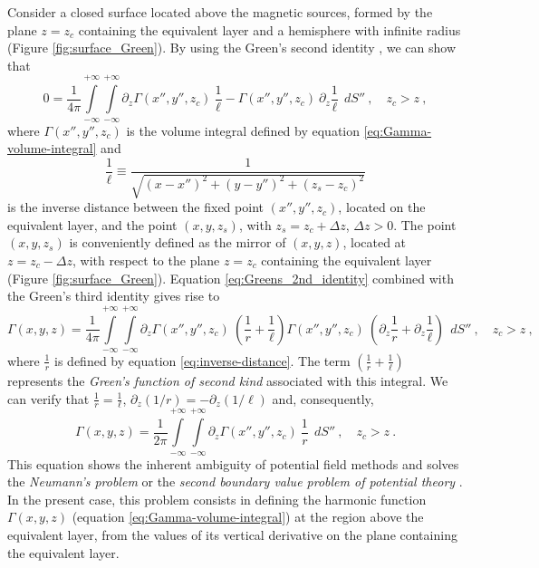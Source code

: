 \label{append:proof-positive-p}

Consider a closed surface located above the magnetic sources, formed by the plane $z = z_{c}$ containing the equivalent layer and a hemisphere with infinite radius
(Figure \ref{fig:surface_Green}).
By using the Green's second identity \citep[][ p. 215]{kellogg1967}, we can show that
\begin{equation}
0 = \frac{1}{4\pi}
\int\limits_{-\infty}^{+\infty}\int\limits_{-\infty}^{+\infty}
\partial_{z} \Gamma(x'', y'', z_{c}) \: \frac{1}{\ell} - 
\Gamma(x'', y'', z_{c}) \: \partial_{z} \frac{1}{\ell}
\:\: dS'' \: , \quad z_{c} > z \: ,
\label{eq:Greens_2nd_identity}
\end{equation}
where $\Gamma(x'', y'', z_{c})$ is the volume integral defined by equation 
\ref{eq:Gamma-volume-integral} and
\begin{equation}
\frac{1}{\ell} \equiv \frac{1}{\sqrt{(x - x'')^{2} +
		(y - y'')^{2} +
		(z_{s} - z_{c})^{2}}}
\label{eq:inv-l}
\end{equation}
is the inverse distance between the fixed point $(x'', y'', z_{c})$, located on the
equivalent layer, and the point $(x, y, z_{s})$, with $z_{s} = z_{c} + \Delta z$,
$\Delta z > 0$.
The point $(x, y, z_{s})$ is conveniently defined as the mirror of $(x, y, z)$,
located at $z = z_{c} - \Delta z$, with respect to the plane $z = z_{c}$ containing
the equivalent layer (Figure \ref{fig:surface_Green}).
Equation \ref{eq:Greens_2nd_identity} combined with the 
Green's third identity \citep[][ p. 219]{kellogg1967} gives rise to
\begin{equation}
\Gamma(x, y, z) = \frac{1}{4\pi}
\int\limits_{-\infty}^{+\infty}\int\limits_{-\infty}^{+\infty}
\partial_{z} \Gamma(x'', y'', z_{c}) \: 
\left( \frac{1}{r} + \frac{1}{\ell} \right)
\Gamma(x'', y'', z_{c}) \: 
\left( \partial_{z} \frac{1}{r} + \partial_{z} \frac{1}{\ell} \right)
\:\: dS'' \: , \quad z_{c} > z \: ,
\label{eq:Greens_3rd_identity}
\end{equation}
where $\frac{1}{r}$ is defined by equation \ref{eq:inverse-distance}.
The term $\left( \frac{1}{r} + \frac{1}{\ell} \right)$ represents the 
\textit{Green's function of second kind} \citep[][ p. 246]{kellogg1967} 
associated with this integral.
We can verify that $\frac{1}{r} = \frac{1}{\ell}$, $\partial_{z} (1/r) = -\partial_{z} (1/\ell)$
and, consequently, 
\begin{equation}
\Gamma(x, y, z) = \frac{1}{2\pi}
\int\limits_{-\infty}^{+\infty}\int\limits_{-\infty}^{+\infty}
\partial_{z} \Gamma(x'', y'', z_{c}) \: \frac{1}{r} 
\:\: dS'' \: , \quad z_{c} > z \: .
\label{eq:Neumann_bvp}
\end{equation}
This equation shows the inherent ambiguity of potential field methods
\citep{roy1962} and solves the \textit{Neumann's problem} or the 
\textit{second boundary value problem of potential theory} \citep[][ p. 246]{kellogg1967}.
In the present case, this problem consists in defining the harmonic function $\Gamma(x, y, z)$ 
(equation \ref{eq:Gamma-volume-integral}) at the region above the equivalent layer,
from the values of its vertical derivative on the plane containing the equivalent layer. 